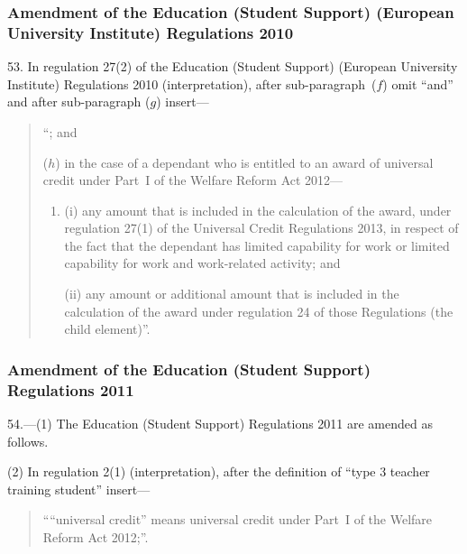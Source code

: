 \documentclass[12pt,a4paper]{article}
\begin{document}
\subsubsection[53. Amendment of the Education (Student Support) (European University Institute) Regulations 2010]{Amendment of the Education (Student Support) (European University Institute) Regulations 2010}

53.  In regulation 27(2) of the Education (Student Support) (European University Institute) Regulations 2010 (interpretation), after sub-paragraph~($f$)  omit “and” and after sub-paragraph ($g$)  insert—
\begin{quotation}
“; and

($h$) in the case of a dependant who is entitled to an award of universal credit under Part~I of the Welfare Reform Act 2012—
\begin{enumerate}\item[]
(i) any amount that is included in the calculation of the award, under regulation 27(1) of the Universal Credit Regulations 2013, in respect of the fact that the dependant has limited capability for work or limited capability for work and work-related activity; and

(ii) any amount or additional amount that is included in the calculation of the award under regulation 24 of those Regulations (the child element)”.
\end{enumerate}
\end{quotation}

\subsubsection[54. Amendment of the Education (Student Support) Regulations 2011]{Amendment of the Education (Student Support) Regulations 2011}

54.—(1) The Education (Student Support) Regulations 2011 are amended as follows.

(2) In regulation 2(1) (interpretation), after the definition of “type 3 teacher training student” insert—
\begin{quotation}
““universal credit” means universal credit under Part~I of the Welfare Reform Act 2012;”.
\end{quotation}
\end{document}
